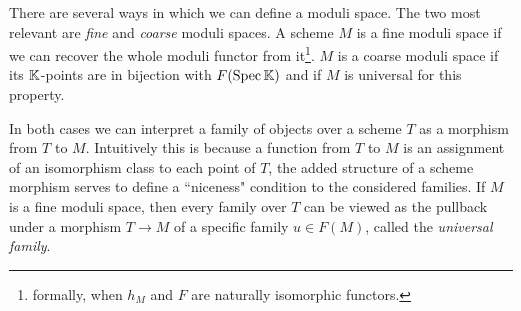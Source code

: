 There are several ways in which we can define a moduli space. The two most relevant are \textit{fine} and \textit{coarse} moduli spaces. A scheme $M$ is a fine moduli space if we can recover the whole moduli functor from it\footnote{formally, when $h_M$ and $F$ are naturally isomorphic functors.}. $M$ is a coarse moduli space if its $\mathbb{K}$-points are in bijection with $F(\mathrm{Spec}\, \mathbb{K})$ and if $M$ is universal for this property. 

In both cases we can interpret a family of objects over a scheme $T$ as a morphism from $T$ to $M$. Intuitively this is because a function from $T$ to $M$ is an assignment of an isomorphism class to each point of $T$, the added structure of a scheme morphism serves to define a ``niceness" condition to the considered families. If $M$ is a fine moduli space, then every family over $T$ can be viewed as the pullback under a morphism $T\to M$ of a specific family $u\in F(M)$, called the \textit{universal family}.

